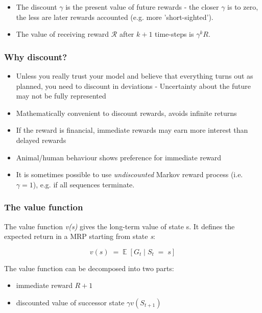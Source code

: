 \documentclass[10pt]{article}
\begin{document}
\begin{itemize}
\item The discount $\gamma$ is the present value of future rewards - the closer $\gamma$ is to zero, the less are later rewards accounted (e.g. more 'short-sighted').
\item The value of receiving reward $\mathcal{R}$ after $k+1$ time-steps is $ \gamma^{k} R$.
\end{itemize}

\subsubsection*{Why discount?}
\begin{itemize}
\item Unless you really trust your model and believe that everything turns out as planned, you need to discount in deviations - Uncertainty about the future may not be fully represented
\item Mathematically convenient to discount rewards, avoids infinite returns
\item If the reward is financial, immediate rewards may earn more interest than delayed rewards
\item Animal/human behaviour shows preference for immediate reward
\item It is sometimes possible to use \textit{undiscounted} Markov reward process (i.e. $\gamma = 1$), e.g. if all sequences terminate.
\end{itemize}

\subsubsection*{The value function}

The value function \textit{v(s)} gives the long-term value of state s. It defines the expected return in a MRP starting from state \textit{s}:

\begin{equation}
v(s) \; = \; \mathbb{E}\;[G_{t} \; | \; S_{t} \; = \; s]
\end{equation}

The value function can be decomposed into two parts:

\begin{itemize}
\item immediate reward $R+1$
\item discounted value of successor state $\gamma v(S_{t+1})$
\end{itemize}
\end{document}
